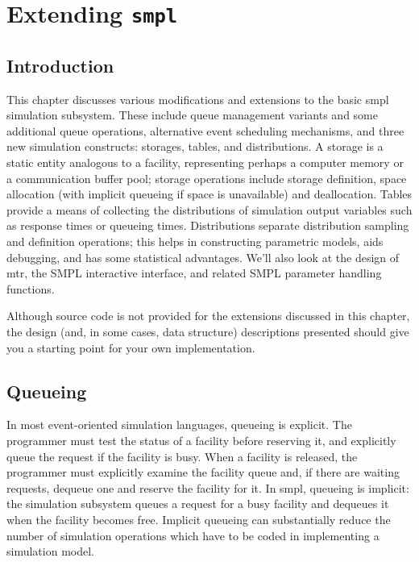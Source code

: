 \chapter{Extending \texttt{smpl}}
\label{chap:extending-smpl}

\section{Introduction}

This chapter discusses various modifications and extensions to the basic
smpl simulation subsystem. These include queue management variants and
some additional queue operations, alternative event scheduling mechanisms,
and three new simulation constructs: storages, tables, and distributions. A
storage is a static entity analogous to a facility, representing perhaps a
computer memory or a communication buffer pool; storage operations include
storage definition, space allocation (with implicit queueing if space is
unavailable) and deallocation. Tables provide a means of collecting the
distributions of simulation output variables such as response times or
queueing times. Distributions separate distribution sampling and definition
operations; this helps in constructing parametric models, aids debugging,
and has some statistical advantages. We'll also look at the design of mtr,
the SMPL interactive interface, and related SMPL parameter handling
functions.

Although source code is not provided for the extensions discussed in this
chapter, the design (and, in some cases, data structure) descriptions
presented should give you a starting point for your own implementation.

\section{Queueing}

In most event-oriented simulation languages, queueing is explicit. The
programmer must test the status of a facility before reserving it, and
explicitly queue the request if the facility is busy. When a facility is released,
the programmer must explicitly examine the facility queue and, if there
are waiting requests, dequeue one and reserve the facility for it. In smpl,
queueing is implicit: the simulation subsystem queues a request for a busy
facility and dequeues it when the facility becomes free. Implicit queueing
can substantially reduce the number of simulation operations which have to
be coded in implementing a simulation model.

